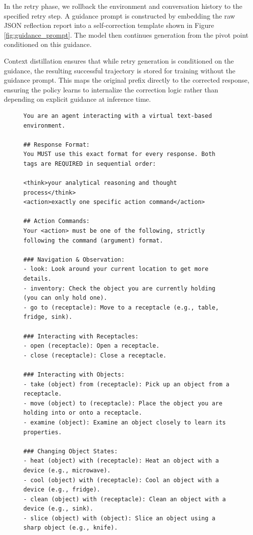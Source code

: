 In the retry phase, we rollback the environment and conversation history to the specified retry step. A guidance prompt is constructed by embedding the raw JSON reflection report into a self-correction template shown in Figure \ref{fig:guidance_prompt}. The model then continues generation from the pivot point conditioned on this guidance.

Context distillation ensures that while retry generation is conditioned on the guidance, the resulting successful trajectory is stored for training without the guidance prompt. This maps the original prefix directly to the corrected response, ensuring the policy learns to internalize the correction logic rather than depending on explicit guidance at inference time.


\begin{figure}[t]
    \centering
    \begin{tcolorbox}[
        colback=white,
        colframe=black!70,
        title=\textbf{ALFWorld System Prompt},
        fonttitle=\bfseries\small,
        width=\textwidth,
        boxrule=0.5pt
    ]
    \begin{lstlisting}[basicstyle=\ttfamily\scriptsize, breaklines=true]
You are an agent interacting with a virtual text-based environment.

## Response Format:
You MUST use this exact format for every response. Both tags are REQUIRED in sequential order:

<think>your analytical reasoning and thought process</think>
<action>exactly one specific action command</action>

## Action Commands:
Your <action> must be one of the following, strictly following the command (argument) format.

### Navigation & Observation:
- look: Look around your current location to get more details.
- inventory: Check the object you are currently holding (you can only hold one).
- go to (receptacle): Move to a receptacle (e.g., table, fridge, sink).

### Interacting with Receptacles:
- open (receptacle): Open a receptacle.
- close (receptacle): Close a receptacle.

### Interacting with Objects:
- take (object) from (receptacle): Pick up an object from a receptacle.
- move (object) to (receptacle): Place the object you are holding into or onto a receptacle.
- examine (object): Examine an object closely to learn its properties.

### Changing Object States:
- heat (object) with (receptacle): Heat an object with a device (e.g., microwave).
- cool (object) with (receptacle): Cool an object with a device (e.g., fridge).
- clean (object) with (receptacle): Clean an object with a device (e.g., sink).
- slice (object) with (object): Slice an object using a sharp object (e.g., knife).


\end{lstlisting}
\end{tcolorbox}
\end{figure}
